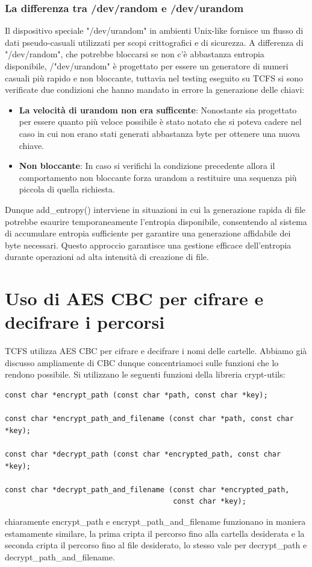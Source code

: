 \subsubsection{La differenza tra /dev/random e /dev/urandom}
Il dispositivo speciale "/dev/urandom" in ambienti Unix-like fornisce un flusso di dati pseudo-casuali utilizzati per scopi crittografici e di sicurezza.
A differenza di "/dev/random", che potrebbe bloccarsi se non c'è abbastanza entropia disponibile, /"dev/urandom" è progettato per essere un generatore di numeri casuali più rapido e non bloccante, tuttavia nel testing eseguito su TCFS si sono verificate due condizioni che hanno mandato in errore la generazione delle chiavi:
\begin{itemize}
    \item \textbf{La velocità di urandom non era sufficente}: Nonostante sia progettato per essere quanto più veloce possibile è stato notato che si poteva cadere nel caso in cui non erano stati generati abbastanza byte per ottenere una nuova chiave.
    \item \textbf{Non bloccante}: In caso si verifichi la condizione precedente allora il comportamento non bloccante forza urandom a restituire una sequenza più piccola di quella richiesta.
\end{itemize}
Dunque add\_entropy() interviene in situazioni in cui la generazione rapida di file potrebbe esaurire temporaneamente l'entropia disponibile, consentendo al sistema di accumulare entropia sufficiente per garantire una generazione affidabile dei byte necessari. Questo approccio garantisce una gestione efficace dell'entropia durante operazioni ad alta intensità di creazione di file.

\section{Uso di AES CBC per cifrare e decifrare i percorsi}
TCFS utilizza AES CBC per cifrare e decifrare i nomi delle cartelle. Abbiamo già discusso ampliamente di CBC dunque concentriamoci sulle funzioni che lo rendono possibile. Si utilizzano le seguenti funzioni della libreria crypt-utils:    
\begin{lstlisting}[style=C, caption=Funzioni di crypt-utils, label=C-crypt-utils.h]
const char *encrypt_path (const char *path, const char *key);

const char *encrypt_path_and_filename (const char *path, const char *key);

const char *decrypt_path (const char *encrypted_path, const char *key);

const char *decrypt_path_and_filename (const char *encrypted_path,
                                       const char *key);
\end{lstlisting}
chiaramente encrypt\_path e encrypt\_path\_and\_filename funzionano in maniera estamamente similare, la prima cripta il percorso fino alla cartella desiderata e la seconda cripta il percorso fino al file desiderato, lo stesso vale per decrypt\_path e decrypt\_path\_and\_filename.

